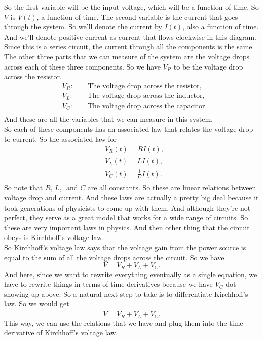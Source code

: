 \begin{enumerate}[label=Step.\arabic*]
  So the first variable will be the input voltage, which
  will be a function of time.
  So $V$ is $V(t)$, a function of time.
  The second variable is the current
  that goes through the system.
  So we'll denote the current by $I(t)$, also a function of time.
  And we'll denote positive current
  as current that flows clockwise in this diagram.
  Since this is a series circuit, the current
  through all the components is the same.
  The other three parts that we can measure of the system
  are the voltage drops across each of these three components.
  So we have $V_R$ to be the voltage drop across the resistor.
  \begin{align*}
    &V _R : \qquad \text{The voltage drop across the resistor,} \\
    &V _L : \qquad \text{The voltage drop across the inductor,} \\
    &V _C : \qquad \text{The voltage drop across the capacitor.} \\
  \end{align*}
  And these are all the variables that we
  can measure in this system. \\
  So each of these components has an associated law that relates the voltage drop to current.
  So the associated law for
  \begin{align*}
    & V_R(t) = R I(t),  \\
    & V_L(t) = L \dot I (t),  \\
    & \dot V _C(t) = \frac{1}{C} I (t). \\
  \end{align*}
  So note that $R,\, L,\, $ and $C$ are all constants.
  So these are linear relations between voltage drop and current.
  And these laws are actually a pretty big deal
  because it took generations of physicists
  to come up with them.
  And although they're not perfect,
  they serve as a great model that works for a wide range of circuits.
  So these are very important laws in physics.
  And then other thing that the circuit obeys is Kirchhoff's voltage law. \\  
  So Kirchhoff's voltage law says that the voltage gain
  from the power source is equal to the sum
  of all the voltage drops across the circuit.
  So we have
  \begin{equation*}
    V = V _R + V _L + V _C.
  \end{equation*}
  And here, since we want to rewrite everything eventually
  as a single equation, we have to rewrite things
  in terms of time derivatives because we have $V _C$ dot showing up above.
  So a natural next step to take is  to differentiate Kirchhoff's law.
  So we would get
  \begin{equation*}
    \dot V = \dot V _R + \dot V _L + \dot V _C.
  \end{equation*}
  This way, we can use the relations that we have
  and plug them into the time derivative
  of Kirchhoff's voltage law.


\end{enumerate}
